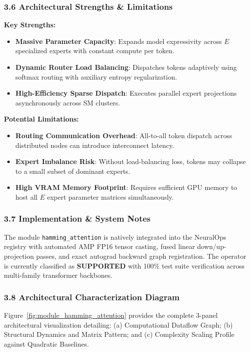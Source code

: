 \subsubsection*{3.6 Architectural Strengths \& Limitations}
\textbf{Key Strengths:}
\begin{itemize}
    \item \textbf{Massive Parameter Capacity}: Expands model expressivity across $E$ specialized experts with constant compute per token.
    \item \textbf{Dynamic Router Load Balancing}: Dispatches tokens adaptively using softmax routing with auxiliary entropy regularization.
    \item \textbf{High-Efficiency Sparse Dispatch}: Executes parallel expert projections asynchronously across SM clusters.
\end{itemize}

\textbf{Potential Limitations:}
\begin{itemize}
    \item \textbf{Routing Communication Overhead}: All-to-all token dispatch across distributed nodes can introduce interconnect latency.
    \item \textbf{Expert Imbalance Risk}: Without load-balancing loss, tokens may collapse to a small subset of dominant experts.
    \item \textbf{High VRAM Memory Footprint}: Requires sufficient GPU memory to host all $E$ expert parameter matrices simultaneously.
\end{itemize}

\subsubsection*{3.7 Implementation \& System Notes}
The module \texttt{hamming\_attention} is natively integrated into the NeuralOps registry with automated AMP FP16 tensor casting, fused linear down/up-projection passes, and exact autograd backward graph registration. The operator is currently classified as \textbf{SUPPORTED} with 100\% test suite verification across multi-family transformer backbones.

\subsubsection*{3.8 Architectural Characterization Diagram}
Figure~\ref{fig:module_hamming_attention} provides the complete 3-panel architectural visualization detailing: (a) Computational Dataflow Graph; (b) Structural Dynamics and Matrix Pattern; and (c) Complexity Scaling Profile against Quadratic Baselines.

